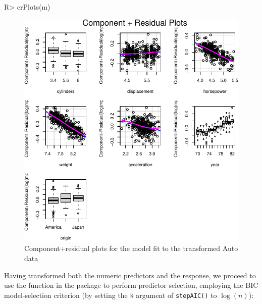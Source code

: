 \documentclass[
]{jss}
\begin{document}
\begin{CodeChunk}
\begin{CodeInput}
R> crPlots(m)
\end{CodeInput}
\begin{figure}

{\centering \includegraphics[width=0.6\linewidth]{JSS-article-reduced_files/figure-latex/Auto-CR-plots-transformed-1} 

}

\caption[Component+residual plots for the model fit to the transformed Auto data]{Component+residual plots for the model fit to the transformed Auto data}\label{fig:Auto-CR-plots-transformed}
\end{figure}
\end{CodeChunk}

Having transformed both the numeric predictors and the response, we
proceed to use the  function in the  package
to perform predictor selection, employing the BIC model-selection
criterion (by setting the \texttt{k} argument of \texttt{stepAIC()} to
\(\log(n)\)):
\end{document}
